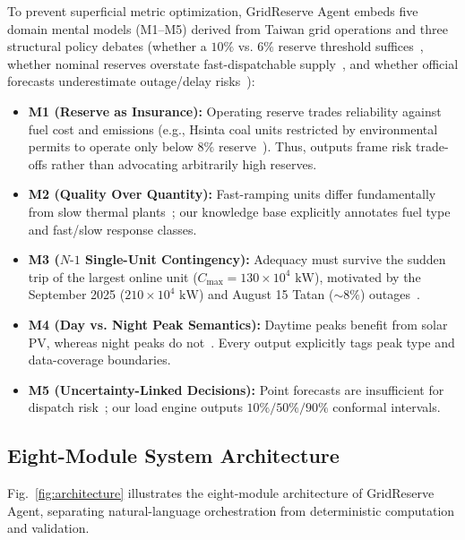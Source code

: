 \documentclass[conference]{IEEEtran}
\begin{document}
To prevent superficial metric optimization, GridReserve Agent embeds five domain mental models (M1--M5) derived from Taiwan grid operations and three structural policy debates (whether a $10\%$ vs. $6\%$ reserve threshold suffices~\cite{ref11,ref16,ref17}, whether nominal reserves overstate fast-dispatchable supply~\cite{ref14}, and whether official forecasts underestimate outage/delay risks~\cite{ref7,ref8,ref9,ref10}):
\begin{itemize}
    \item \textbf{M1 (Reserve as Insurance):} Operating reserve trades reliability against fuel cost and emissions (e.g., Hsinta coal units restricted by environmental permits to operate only below $8\%$ reserve~\cite{ref18}). Thus, outputs frame risk trade-offs rather than advocating arbitrarily high reserves.
    \item \textbf{M2 (Quality Over Quantity):} Fast-ramping units differ fundamentally from slow thermal plants~\cite{ref14}; our knowledge base explicitly annotates fuel type and fast/slow response classes.
    \item \textbf{M3 ($N\text{-}1$ Single-Unit Contingency):} Adequacy must survive the sudden trip of the largest online unit ($C_{\max} = 130 \times 10^4\text{ kW}$), motivated by the September 2025 ($210 \times 10^4\text{ kW}$) and August 15 Tatan ($\sim 8\%$) outages~\cite{ref10,ref17}.
    \item \textbf{M4 (Day vs. Night Peak Semantics):} Daytime peaks benefit from solar PV, whereas night peaks do not~\cite{ref4,ref7,ref8}. Every output explicitly tags peak type and data-coverage boundaries.
    \item \textbf{M5 (Uncertainty-Linked Decisions):} Point forecasts are insufficient for dispatch risk~\cite{ref24,ref29}; our load engine outputs $10\%/50\%/90\%$ conformal intervals.
\end{itemize}

\subsection{Eight-Module System Architecture}
\label{sec:architecture}

Fig.~\ref{fig:architecture} illustrates the eight-module architecture of GridReserve Agent, separating natural-language orchestration from deterministic computation and validation.
\end{document}
